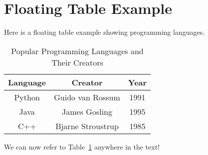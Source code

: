 \documentclass{article}
\begin{document}
\section*{Floating Table Example}

Here is a floating table example showing programming languages.

\begin{table}[h!]  %
\centering
\begin{tabular}{|c|c|c|}
\hline
\textbf{Language} & \textbf{Creator} & \textbf{Year} \\
\hline
Python   & Guido van Rossum & 1991 \\
Java     & James Gosling    & 1995 \\
C++      & Bjarne Stroustrup & 1985 \\
\hline
\end{tabular}
\caption{Popular Programming Languages and Their Creators}
\label{tab:languages}
\end{table}

We can now refer to Table~\ref{tab:languages} anywhere in the text!
\end{document}
